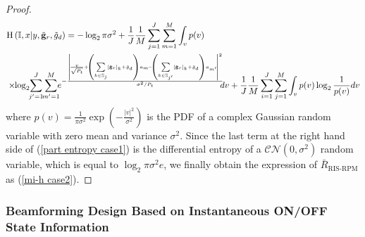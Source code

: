 \documentclass[draftclsnofoot,onecolumn,12pt]{IEEEtran}
\begin{document}
\begin{proof}
\begin{align}
	&\text{H}\left(\mathbb{I},x|y,\tilde{\bf g}_r,\tilde{ g}_d\right)=-\log_2 \pi\sigma^2+\frac{1}{{J}}\frac{1}{M}\sum_{j=1}^{J}\sum_{m=1}^{M}\int_{v} p(v)\notag\\
	&\times \hspace{-0.1cm}\log_2 \hspace{-0.1cm} \sum_{j'=1}^{J} \hspace{-0.1cm} \sum_{m'=1}^{M} \hspace{-0.15cm} e^{-\frac{\left| \hspace{-0.05cm} \frac{v}{\sqrt{P_t}}+ \hspace{-0.05cm} \left(\sum\limits_{k\in \mathbb{S}_j} \left[{\tilde{\bf g}}_r\right]_k + {\tilde{g}}_d\right)a_m \hspace{-0.05cm} -\hspace{-0.05cm}\left(\sum\limits_{k\in \mathbb{S}_{j'}} \left[{\tilde{\bf g}}_r\right]_k + {\tilde{g}}_d\right)a_{m'} \hspace{-0.05cm} \right|^2}{\sigma^2/P_t}} \hspace{-0.15cm} dv +\frac{1}{{J}}\frac{1}{M}\sum_{i=1}^{J}\sum_{j=1}^{M}\int_{v} p(v)\log_2 \frac{1}{p(v)}  dv 
	\end{align}
	where $p(v)= \frac{1}{\pi \sigma^2}\exp({-\frac{|v|^2}{\sigma^2}})$ is the PDF of a complex Gaussian random variable with zero mean and variance $\sigma^2$. 
	Since the last term at the right hand side of (\ref{part entropy case1}) is the differential entropy of a $\mathcal{CN}( { 0},\sigma^2)$ random variable, which is equal to $\log_2\pi\sigma^2e$, we finally obtain the expression of  $\bar{R}_\text{RIS-RPM}$ as (\ref{mi-h case2}). 
\end{proof}


\subsubsection{Beamforming Design Based on Instantaneous ON/OFF State Information}
\end{document}
